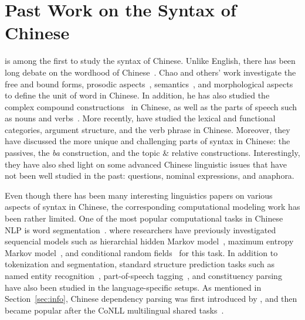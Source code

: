\documentclass[11pt,letterpaper]{article}
\begin{document}
\section{Past Work on the Syntax of Chinese}
\cite{chao1968grammar} is among the first to study the syntax of Chinese. Unlike 
English, there has been long debate on the wordhood of Chinese~\citep{duanmu1998wordhood}.
Chao and others' work investigate the free and bound forms,
prosodic aspects~\citep{shen1990prosody}, semantics~\cite{li1972semantics,wu1999syntax}, and morphological aspects~\citep{tang1989studies,dai1992chinese,sproat2002corpus} to define the unit of word in Chinese.
In addition, he has also studied the complex compound constructions~\citep{zhou1999morphology,zhang2000extraction} in Chinese,
as well as the parts of speech such as nouns and verbs~\citep{krifka1995common}.
More recently, \cite{huang2009syntax} have studied
the lexical and functional categories,
argument structure, and the verb phrase in Chinese.
Moreover, they have discussed the more unique and challenging parts
of syntax in Chinese: the passives, the \emph{ba} construction,
and the topic \& relative constructions.
Interestingly, they have also shed light on some advanced Chinese linguistic issues 
that have not been well studied in the past: 
questions, nominal expressions, and anaphora.

Even though there has been many interesting linguistics papers on various aspects
of syntax in Chinese, the corresponding computational modeling work has been rather limited.
One of the most popular computational tasks in Chinese NLP is word segmentation~\citep{xue2003chinese,sproat2003first}.
where researchers have previously investigated sequencial models such as
hierarchial hidden Markov model~\citep{zhang2003hhmm}, maximum entropy Markov model~\citep{xue2003chinese}, and conditional random fields~\citep{zhao2006improved} for this task.
In addition to tokenization and segmentation, standard structure prediction tasks such as 
named entity recognition~\citep{xue2003chinese,wu2005chinese}, part-of-speech tagging~\citep{ng2004chinese,jiang2008cascaded}, and constituency parsing~\citep{wu1997stochastic,wang2006fast}
have also been studied in the language-specific setups.
As mentioned in Section~\ref{sec:info}, Chinese dependency parsing was first introduced
by \cite{bikel2000two}, and then became popular after the CoNLL multilingual shared tasks~\citep{buchholz2006conll,nilsson2007conll}.
\end{document}

